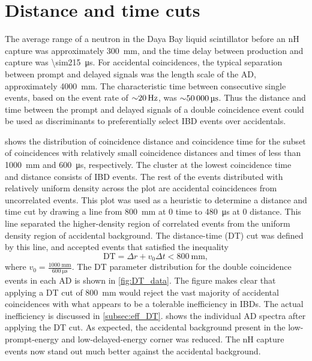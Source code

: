 \section{Distance and time cuts}
\label{sec:DT_cut}

The average range of a neutron
in the Daya Bay liquid scintillator
before an nH capture
was approximately \SI{300}{\milli\meter},
and the time delay between production and capture was \SI{\sim215}{\us}.
For accidental coincidences, the typical separation between prompt and delayed signals was
the length scale of the AD, approximately \SI{4000}{\milli\meter}.
The characteristic time between consecutive single events,
based on the  event rate of $\SI{\sim20}{\Hz}$,
was $\SI{\sim50000}{\us}$.
Thus the distance and time between the prompt and delayed signals
of a double coincidence event could be used
as discriminants to preferentially select IBD events over accidentals.


 shows the distribution of
coincidence distance and coincidence time
for the subset of  coincidences with
relatively small coincidence distances and times
of less than \SI{1000}{\milli\meter} and \SI{600}{\micro\second},
respectively.
The cluster at the lowest coincidence time and distance
consists of IBD events.
The rest of the events distributed with relatively uniform density
across the plot are accidental coincidences from uncorrelated events.
This plot was used as a heuristic to determine a distance and time cut
by drawing a line from \SI{800}{\milli\meter} at $0$ time
to \SI{480}{\micro\second} at $0$ distance.
This line separated the higher-density region
of correlated events from the uniform density region of accidental background.
The distance-time (DT) cut was defined by this line,
and accepted events that satisfied the inequality
\begin{equation}\label{eq:DT}
    \text{DT} = \Delta r + v_0 \Delta t < \SI{800}{\milli\meter},
\end{equation}
where $v_0 = \frac{\SI{1000}{\milli\meter}}{\SI{600}{\micro\second}}$.
The DT parameter distribution for the double coincidence events
in each AD is shown in \cref{fig:DT_data}.
The figure makes clear that applying a DT cut of \SI{800}{\mm}
would reject the vast majority of accidental coincidences
with what appears to be a tolerable inefficiency in IBDs.
The actual inefficiency is discussed in \cref{subsec:eff_DT}.
 shows the individual AD spectra
after applying the DT cut.
As expected, the accidental background present
in the low-prompt-energy and low-delayed-energy corner was reduced.
The nH capture events now stand out much better
against the accidental background.

